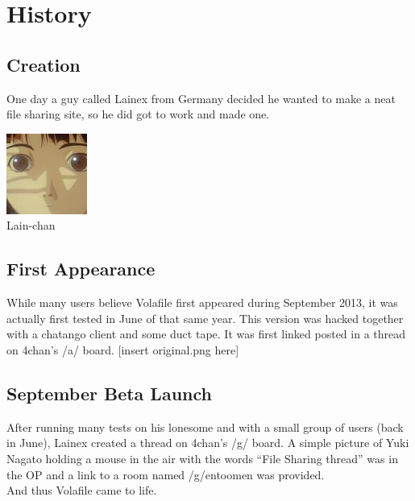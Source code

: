 \documentclass[12pt]{report}
\begin{document}
{        \vfill
        \pagebreak

        \chapter{History}
        \section{Creation}
        One day a guy called Lainex from Germany decided he wanted to make a neat file sharing site, so he did got to work and made one.

        \begin{image}
            \flushright
            \includegraphics[scale=0.25]{images/lain.jpg}\\
            Lain-chan
            \label{fig:kawaii}
        \end{image}

        \section{First Appearance}
	While many users believe Volafile first appeared during September 2013, it was
        actually first tested in June of that same year. This version was hacked together
        with a chatango client and some duct tape. It was first linked posted in a thread
        on 4chan's /a/ board.
        [insert original.png here]

        \vfill
        \pagebreak

        \section{September Beta Launch}
        After running many tests on his lonesome and with a small group of users (back in June),
        Lainex created a thread on 4chan's /g/ board. A simple picture of Yuki Nagato holding a
        mouse in the air with the words ``File Sharing thread'' was in the OP and a link to a
        room named /g/entoomen was provided.\footnotemark \\
        And thus Volafile came to life.

}
\end{document}
